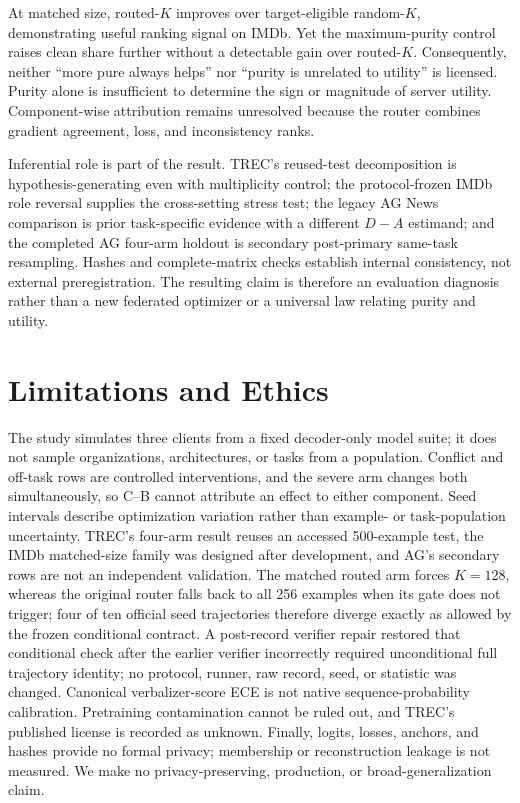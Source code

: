 \documentclass[letterpaper]{article}
\begin{document}
At matched size, routed-\(K\) improves over target-eligible random-\(K\),
demonstrating useful ranking signal on IMDb.  Yet the maximum-purity control
raises clean share further without a detectable gain over routed-\(K\).
Consequently, neither ``more pure always helps'' nor ``purity is unrelated to
utility'' is licensed.  Purity alone is insufficient to determine the sign or
magnitude of server utility.  Component-wise attribution remains unresolved
because the router combines gradient agreement, loss, and inconsistency ranks.

Inferential role is part of the result.  TREC's reused-test decomposition is
hypothesis-generating even with multiplicity control; the protocol-frozen IMDb
role reversal supplies the cross-setting stress test; the legacy AG News
comparison is prior task-specific evidence with a different \(D-A\) estimand;
and the completed AG four-arm holdout is secondary post-primary same-task
resampling.  Hashes and complete-matrix checks establish internal consistency,
not external preregistration.  The resulting claim is
therefore an evaluation diagnosis rather than a new federated optimizer or a
universal law relating purity and utility.

\section{Limitations and Ethics}
The study simulates three clients from a fixed decoder-only model suite; it
does not sample organizations, architectures, or tasks from a population.
Conflict and off-task rows are controlled interventions, and the severe arm
changes both simultaneously, so C--B cannot attribute an effect to either
component.  Seed intervals describe optimization variation rather than
example- or task-population uncertainty.  TREC's four-arm result reuses an
accessed 500-example test, the IMDb matched-size family was designed after
development, and AG's secondary rows are not an independent validation.
The matched routed arm forces \(K=128\), whereas the original router falls
back to all 256 examples when its gate does not trigger; four of ten official
seed trajectories therefore diverge exactly as allowed by the frozen
conditional contract.  A post-record verifier repair restored that conditional
check after the earlier verifier incorrectly required unconditional full
trajectory identity; no protocol, runner, raw record, seed, or statistic was
changed.
Canonical verbalizer-score ECE is not native sequence-probability calibration.
Pretraining contamination cannot be ruled out, and TREC's published license is
recorded as unknown.  Finally, logits, losses, anchors, and hashes provide no
formal privacy; membership or reconstruction leakage is not measured.  We make
no privacy-preserving, production, or broad-generalization claim.
\end{document}
